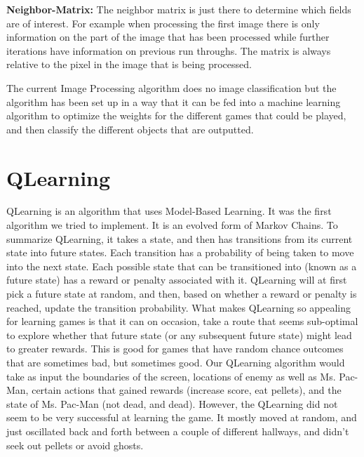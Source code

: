 \documentclass[12pt,journal,compsoc]{IEEEtran}
\begin{document}
\textbf{Neighbor-Matrix:}
The neighbor matrix is just there to determine which fields are of interest. For example when processing the first image there is only information on the part of the image that has been processed while further iterations have information on previous run throughs. The matrix is always relative to the pixel in the image that is being processed.

    The current Image Processing algorithm does no image classification but the algorithm has been set up in a way that it can be fed into a machine learning algorithm to optimize the weights for the different games that could be played, and then classify the different objects that are outputted.

\section{QLearning}
QLearning is an algorithm that uses Model-Based Learning. It was the first algorithm we tried to implement. It is an evolved form of Markov Chains. To summarize QLearning, it takes a state, and then has transitions from its current state into future states. Each transition has a probability of being taken to move into the next state. Each possible state that can be transitioned into (known as a future state) has a reward or penalty associated with it. QLearning will at first pick a future state at random, and then, based on whether a reward or penalty is reached, update the transition probability. What makes QLearning so appealing for learning games is that it can on occasion, take a route that seems sub-optimal to explore whether that future state (or any subsequent future state) might lead to greater rewards. This is good for games that have random chance outcomes that are sometimes bad, but sometimes good.
Our QLearning algorithm would take as input the boundaries of the screen, locations of enemy as well as Ms. Pac-Man, certain actions that gained rewards (increase score, eat pellets), and the state of Ms. Pac-Man (not dead, and dead). However, the QLearning did not seem to be very successful at learning the game. It mostly moved at random, and just oscillated back and forth between a couple of different hallways, and didn’t seek out pellets or avoid ghosts.
\end{document}
